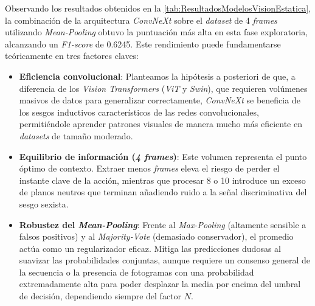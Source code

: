 Observando los resultados obtenidos en la \autoref{tab:ResultadosModelosVisionEstatica}, la combinación de la arquitectura \textit{ConvNeXt} sobre el \textit{dataset} de 4 \textit{frames} utilizando \textit{Mean-Pooling} obtuvo la puntuación más alta en esta fase exploratoria, alcanzando un \textit{F1-score} de 0.6245. Este rendimiento puede fundamentarse teóricamente en tres factores claves:
\begin{itemize}
    \item \textbf{Eficiencia convolucional}: Planteamos la hipótesis a posteriori de que, a diferencia de los \textit{Vision Transformers} (\textit{ViT} y \textit{Swin}), que requieren volúmenes masivos de datos para generalizar correctamente, \textit{ConvNeXt} se beneficia de los sesgos inductivos característicos de las redes convolucionales, permitiéndole aprender patrones visuales de manera mucho más eficiente en \textit{datasets} de tamaño moderado. 
    \item \textbf{Equilibrio de información (\textit{4 frames})}: Este volumen representa el punto óptimo de contexto. Extraer menos \textit{frames} eleva el riesgo de perder el instante clave de la acción, mientras que procesar 8 o 10 introduce un exceso de planos neutros que terminan añadiendo ruido a la señal discriminativa del sesgo sexista. 
    \item \textbf{Robustez del \textit{Mean-Pooling}}: Frente al \textit{Max-Pooling} (altamente sensible a falsos positivos) y al \textit{Majority-Vote} (demasiado conservador), el promedio actúa como un regularizador eficaz. Mitiga las predicciones dudosas al suavizar las probabilidades conjuntas, aunque requiere un consenso general de la secuencia o la presencia de fotogramas con una probabilidad extremadamente alta para poder desplazar la media por encima del umbral de decisión, dependiendo siempre del factor $N$.
\end{itemize}

